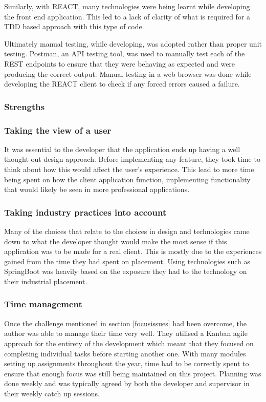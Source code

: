 Similarly, with REACT, many technologies were being learnt while developing the front end application.
This led to a lack of clarity of what is required for a TDD based approach with this type of code.

Ultimately manual testing, while developing, was adopted rather than proper unit testing.
Postman, an API testing tool, was used to manually test each of the REST endpoints to ensure that they were behaving as expected and were producing
the correct output.
Manual testing in a web browser was done while developing the REACT client to check if any forced errors caused a failure.


\subsubsection{Strengths}

\subsubsection*{Taking the view of a user}
It was essential to the developer that the application ends up having a well thought out design approach.
Before implementing any feature, they took time to think about how this would affect the user's experience. 
This lead to more time being spent on how the client application function, implementing functionality that would likely be seen in more professional
applications.

\subsubsection*{Taking industry practices into account}
Many of the choices that relate to the choices in design and technologies came down to what the developer thought would make the most sense if this application
was to be made for a real client.
This is mostly due to the experiences gained from the time they had spent on placement.
Using technologies such as SpringBoot was heavily based on the exposure they had to the technology on their industrial placement.

\subsubsection*{Time management}
Once the challenge mentioned in section \ref{focusissues} had been overcome, the author was able to manage their time very well.
They utilised a Kanban agile approach for the entirety of the development which meant that they focused on completing individual tasks before starting
another one. 
With many modules setting up assignments throughout the year, time had to be correctly spent to ensure that enough focus was still being maintained 
on this project.
Planning was done weekly and was typically agreed by both the developer and supervisor in their weekly catch up sessions. 

